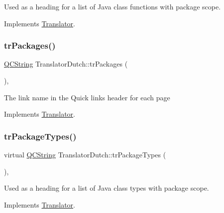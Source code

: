 Used as a heading for a list of Java class functions with package scope. 

Implements \mbox{\hyperlink{class_translator}{Translator}}.

\mbox{\label{class_translator_dutch_a62e097fe0af07f5f470df1f8cf367a83}} 
\subsubsection{\texorpdfstring{trPackages()}{trPackages()}}
{\footnotesize\ttfamily \mbox{\hyperlink{class_q_c_string}{Q\+C\+String}} Translator\+Dutch\+::tr\+Packages (\begin{DoxyParamCaption}{ }\end{DoxyParamCaption})\hspace{0.3cm}{\ttfamily [inline]}, {\ttfamily [virtual]}}

The link name in the Quick links header for each page 

Implements \mbox{\hyperlink{class_translator}{Translator}}.

\mbox{\label{class_translator_dutch_ae69b64135bf5821b2835069349077c06}} 
\subsubsection{\texorpdfstring{trPackageTypes()}{trPackageTypes()}}
{\footnotesize\ttfamily virtual \mbox{\hyperlink{class_q_c_string}{Q\+C\+String}} Translator\+Dutch\+::tr\+Package\+Types (\begin{DoxyParamCaption}{ }\end{DoxyParamCaption})\hspace{0.3cm}{\ttfamily [inline]}, {\ttfamily [virtual]}}

Used as a heading for a list of Java class types with package scope. 

Implements \mbox{\hyperlink{class_translator}{Translator}}.

\mbox{\label{class_translator_dutch_a5cbf8865535ebece78ff6a41c904e327}} 
